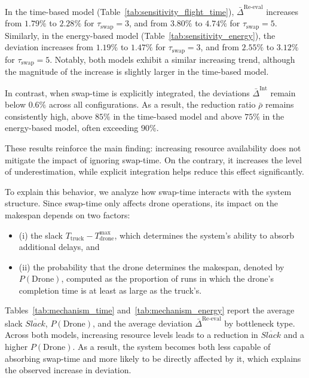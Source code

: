 \documentclass[3p, authoryear, 11pt]{elsarticle}
\begin{document}
In the time-based model (Table~\ref{tab:sensitivity_flight_time}), $\bar{\Delta}^{\mathrm{Re\text{-}eval}}$ increases from $1.79\%$ to $2.28\%$ for $\tau_{\mathrm{swap}}=3$, and from $3.80\%$ to $4.74\%$ for $\tau_{\mathrm{swap}}=5$. 
Similarly, in the energy-based model (Table~\ref{tab:sensitivity_energy}), the deviation increases from $1.19\%$ to $1.47\%$ for $\tau_{\mathrm{swap}}=3$, and from $2.55\%$ to $3.12\%$ for $\tau_{\mathrm{swap}}=5$. 
Notably, both models exhibit a similar increasing trend, although the magnitude of the increase is slightly larger in the time-based model.

In contrast, when swap-time is explicitly integrated, the deviations $\bar{\Delta}^{\mathrm{Int}}$ remain below $0.6\%$ across all configurations. 
As a result, the reduction ratio $\bar{\rho}$ remains consistently high, above $85\%$ in the time-based model and above $75\%$ in the energy-based model, often exceeding $90\%$.

These results reinforce the main finding: increasing resource availability does not mitigate the impact of ignoring swap-time. 
On the contrary, it increases the level of underestimation, while explicit integration helps reduce this effect significantly.

To explain this behavior, we analyze how swap-time interacts with the system structure. Since swap-time only affects drone operations, its impact on the makespan depends on two factors: 
\begin{itemize}
    \item (i) the slack $T_{\mathrm{truck}} - T_{\mathrm{drone}}^{\max}$, which determines the system’s ability to absorb additional delays, and
    \item (ii) the probability that the drone determines the makespan, denoted by $P(\text{Drone})$, computed as the proportion of runs in which the drone's completion time is at least as large as the truck's.
\end{itemize}

 
Tables~\ref{tab:mechanism_time} and~\ref{tab:mechanism_energy} report the average slack $\overline{Slack}$, $P(\text{Drone})$, and the average deviation $\bar{\Delta}^{\mathrm{Re\text{-}eval}}$ by bottleneck type.
Across both models, increasing resource levels leads to a reduction in $\overline{Slack}$ and a higher $P(\text{Drone})$. 
As a result, the system becomes both less capable of absorbing swap-time and more likely to be directly affected by it, which explains the observed increase in deviation.
\end{document}
